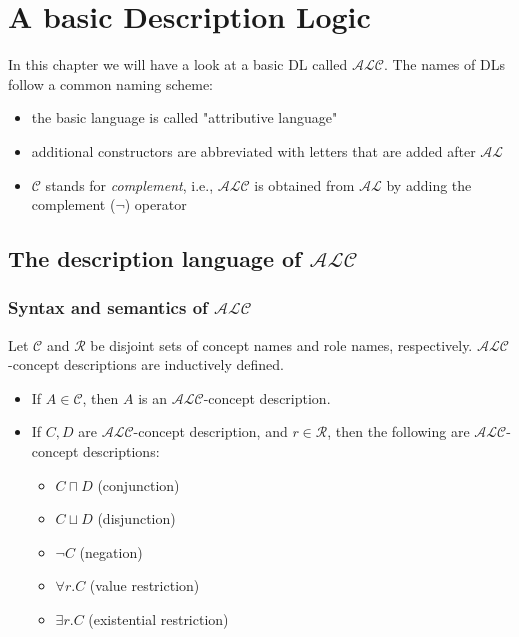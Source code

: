 \chapter{A basic Description Logic}
In this chapter we will have a look at a basic DL called $\mathcal{ALC}$. 
The names of DLs follow a common naming scheme:
\begin{itemize}
	\item the basic language is called "attributive language"
	\item additional constructors are abbreviated with letters that are added after $ \mathcal{AL} $ 
	\item $ \mathcal{C} $ stands for \textit{complement}, i.e., $ \mathcal{ALC} $ is obtained from $ \mathcal{AL} $ by adding the complement ($ \neg $) operator
\end{itemize}

\section{The description language of $\mathcal{ALC}$}
\subsection{Syntax and semantics of $\mathcal{ALC}$}
\begin{definition}
	Let $\mathscr{C}$ and $\mathscr{R}$ be disjoint sets of concept names and role names, respectively.
	$\mathcal{ALC}$-concept descriptions are inductively defined.
	\begin{itemize}
		\item If $ A \in \mathscr{C} $, then $ A $ is an $ \mathcal{ALC}$-concept description.
		\item If $ C,D $ are $ \mathcal{ALC}$-concept description, and $ r \in \mathscr{R} $, then the following are $\mathcal{ALC}$-concept descriptions:
			\begin{itemize}
				\item $ C \sqcap D $ (conjunction)
				\item $ C \sqcup D $ (disjunction)
				\item $ \neg C $ (negation)
				\item $ \forall r.C $ (value restriction)
				\item $ \exists r.C $ (existential restriction)
			\end{itemize}
	\end{itemize}
\end{definition}

